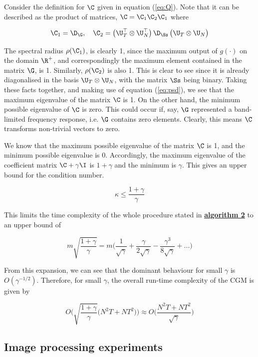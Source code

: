 Consider the definition for $\C$ given in equation (\ref{eq:Q}). Note that it can be described as the product of matrices, $\C = \C_1 \C_2 \C_1$ where 
 
 $$
 \C_1 = \D_{\G}, \quad \C_2 = \big(\U_T^\top \otimes \U_N^\top \big)\, \D_{\Ss} \, \big(\U_T \otimes \U_N \big)
 $$
 
The spectral radius $\rho(\C_1)$, is clearly 1, since the maximum output of $g(\cdot)$ on the domain $\R^{+}$, and correspondingly the maximum element contained in the matrix $\G$, is 1. Similarly, $\rho(\C_2)$ is also 1. This is clear to see since it is already diagonalised in the basis $\U_T \otimes \U_N$, with the matrix $\Ss$ being binary.  Taking these facts together, and making use of equation (\ref{eq:psd}), we see that the maximum eigenvalue of the matrix $\C$ is 1. On the other hand, the minimum possible eigenvalue of $\C$ is zero. This could occur if, say, $\G$ represented a band-limited frequency response, i.e. $\G$ contains zero elements. Clearly, this means $\C$ transforms non-trivial vectors to zero. 

We know that the maximum possible eigenvalue of the matrix $\C$ is 1, and the minimum possible eigenvalue is $0$. Accordingly, the maximum eigenvalue of the coefficient matrix $\C + \gamma \I$ is $1 + \gamma$ and the minimum is $\gamma$. This gives an upper bound for the condition number. 
 
\begin{equation}
 \kappa \leq \frac{1 + \gamma}{\gamma}
\end{equation}
 
This limits the time complexity of the whole procedure stated in \hyperlink{al2}{\textbf{algorithm 2}} to an upper bound of 

$$
m \sqrt{\frac{1 + \gamma}{\gamma}} = m \Big( \frac{1}{\sqrt{\gamma}} + \frac{\gamma}{2\sqrt{\gamma}}  - \frac{\gamma^3}{8\sqrt{\gamma}} + ... \Big)
$$

From this expansion, we can see that the dominant behaviour for small $\gamma$ is $O(\gamma^{-1/2})$. Therefore, for small $\gamma$, the overall run-time complexity of the CGM is given by 

\begin{equation}
\label{eq:OCGM}
O\Bigg(\sqrt{\frac{1 + \gamma}{\gamma}}\big(N^2T + NT^2\big) \Bigg) \approx O\Bigg(\frac{N^2T + NT^2}{\sqrt{\gamma}} \Bigg)
\end{equation}

\subsection{Image processing experiments}

